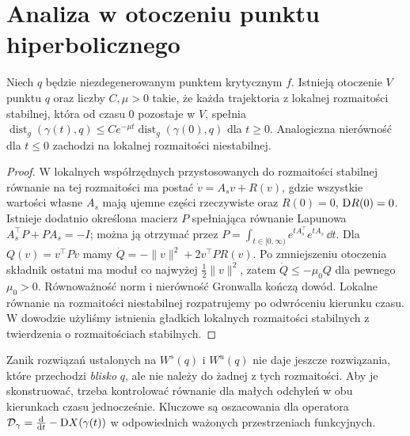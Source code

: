 \section{Analiza w otoczeniu punktu hiperbolicznego}
\begin{lemat}
\label{lem:morse-exponential-v11}
Niech $q$ będzie niezdegenerowanym punktem krytycznym $f$.
Istnieją otoczenie $V$ punktu $q$ oraz liczby $C,\mu>0$
takie, że każda trajektoria z lokalnej rozmaitości stabilnej,
która od czasu $0$ pozostaje w $V$, spełnia
$\operatorname{dist}_g(\gamma(t),q)\le
C e^{-\mu t}\operatorname{dist}_g(\gamma(0),q)$ dla $t\ge0$.
Analogiczna nierówność dla $t\le0$ zachodzi na lokalnej
rozmaitości niestabilnej.
\end{lemat}
\begin{proof}
W lokalnych współrzędnych przystosowanych do rozmaitości
stabilnej równanie na tej rozmaitości ma postać
$\dot v=A_sv+R(v)$, gdzie wszystkie wartości własne
$A_s$ mają ujemne części rzeczywiste oraz $R(0)=0$,
$\mathrm D R(0)=0$. Istnieje dodatnio określona macierz $P$
spełniająca równanie Lapunowa
$A_s^\top P+PA_s=-I$; można ją otrzymać przez
$P=\int_{t\in[0,\infty)}e^{tA_s^\top}e^{tA_s}\,\dd t$.
Dla $Q(v)=v^\top Pv$ mamy
$\dot Q=-\|v\|^2+2v^\top PR(v)$.
Po zmniejszeniu otoczenia składnik ostatni ma moduł
co najwyżej $\frac12\|v\|^2$, zatem
$\dot Q\le-\mu_0 Q$ dla pewnego $\mu_0>0$.
Równoważność norm i nierówność Gronwalla kończą dowód.
Lokalne równanie na rozmaitości niestabilnej rozpatrujemy
po odwróceniu kierunku czasu. W dowodzie użyliśmy istnienia
gładkich lokalnych rozmaitości stabilnych z twierdzenia
o rozmaitościach stabilnych.
\end{proof}

\begin{uwaga}
Zanik rozwiązań ustalonych na $W^s(q)$ i $W^u(q)$ nie daje
jeszcze rozwiązania, które przechodzi \emph{blisko} $q$,
ale nie należy do żadnej z tych rozmaitości. Aby je
skonstruować, trzeba kontrolować równanie dla małych
odchyleń w obu kierunkach czasu jednocześnie.
Kluczowe są oszacowania dla operatora
$\mathcal D_\gamma=\tfrac{\mathrm d}{\mathrm d t}-\mathrm D X(\gamma(t))$
w odpowiednich ważonych przestrzeniach funkcyjnych.
\end{uwaga}

